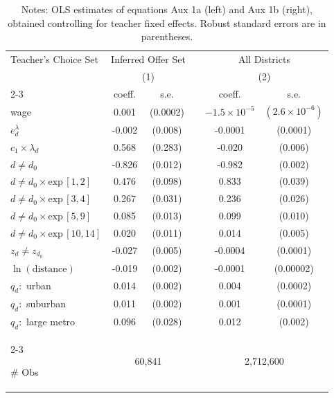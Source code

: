 \documentclass[notitlepage,12pt]{article}%
\begin{document}
\begin{table}[ptb]
\caption{OLS of Teacher-District Match (2014)}
\centering
\begin{tabular*}{\textwidth}{@{\extracolsep{\fill}} l cc c cc @{}}
\hline\hline
Teacher's Choice Set 
    & \multicolumn{2}{c}{Inferred Offer Set} 
    &  
    & \multicolumn{2}{c}{All Districts} \\
    & \multicolumn{2}{c}{(1)} 
    &  
    & \multicolumn{2}{c}{(2)} \\

\cline{2-3} \cline{5-6}

& coeff. & s.e. & & coeff. & s.e. \\ 
\hline

wage                         & 0.001  & (0.0002)   & & $-1.5\times 10^{-5}$ & $(2.6\times 10^{-6})$ \\
$e_d^{\lambda}$              & -0.002 & (0.008)    & & -0.0001              & (0.0001) \\
$c_1 \times \lambda_d$       & 0.568  & (0.283)    & & -0.020               & (0.006) \\
$d \neq d_0$                 & -0.826 & (0.012)    & & -0.982               & (0.002) \\
$d \neq d_0 \times \text{exp}\,[1,2]$  
                             & 0.476  & (0.098)    & & 0.833                & (0.039) \\
$d \neq d_0 \times \text{exp}\,[3,4]$  
                             & 0.267  & (0.031)    & & 0.236                & (0.026) \\
$d \neq d_0 \times \text{exp}\,[5,9]$  
                             & 0.085  & (0.013)    & & 0.099                & (0.010) \\
$d \neq d_0 \times \text{exp}\,[10,14]$ 
                             & 0.020  & (0.011)    & & 0.014                & (0.005) \\
$z_d \neq z_{d_0}$           & -0.027 & (0.005)    & & -0.0004              & (0.0001) \\
$\ln(\text{distance})$       & -0.019 & (0.002)    & & -0.0001              & (0.00002) \\
$q_d:$ urban                 & 0.014  & (0.002)    & & 0.004                & (0.0002) \\
$q_d:$ suburban              & 0.011  & (0.002)    & & 0.001                & (0.0001) \\
$q_d:$ large metro           & 0.096  & (0.028)    & & 0.012                & (0.002) \\\cline{2-3} \cline{5-6}

\# Obs 
& \multicolumn{2}{c}{60{,}841} 
& 
& \multicolumn{2}{c}{2{,}712{,}600} \\

\hline\hline
\end{tabular*}
\caption*{ {\footnotesize {Notes: OLS estimates of equations Aux 1a (left)
and Aux 1b (right), obtained controlling for teacher fixed effects. Robust
standard errors are in parentheses.}}}
\vspace{-0.7cm}
\end{table}
\end{document}
